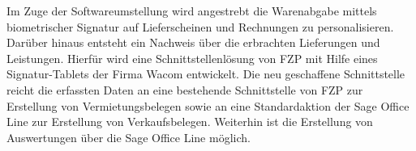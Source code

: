 Im Zuge der Softwareumstellung wird angestrebt die Warenabgabe mittels biometrischer Signatur auf Lieferscheinen und Rechnungen zu personalisieren. Darüber hinaus entsteht ein Nachweis über die erbrachten Lieferungen und Leistungen. Hierfür wird eine Schnittstellenlösung von FZP mit Hilfe eines Signatur-Tablets der Firma Wacom entwickelt. Die neu geschaffene Schnittstelle reicht die erfassten Daten an eine bestehende Schnittstelle von FZP zur Erstellung von Vermietungsbelegen sowie an eine Standardaktion der Sage Office Line zur Erstellung von Verkaufsbelegen. Weiterhin ist die Erstellung von Auswertungen über die Sage Office Line möglich. \cite{einleitung1}